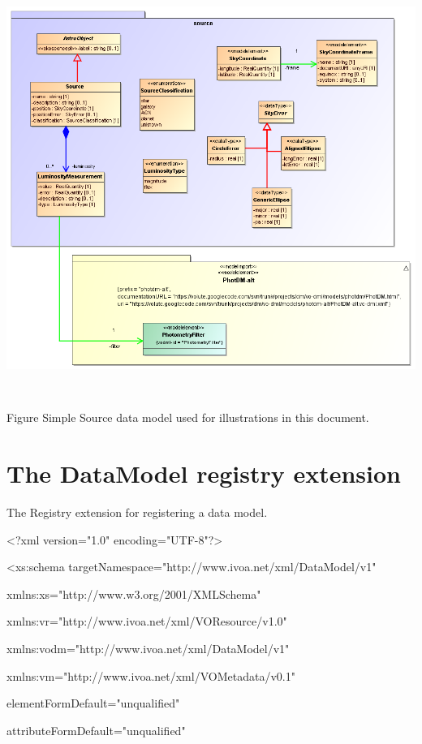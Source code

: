 \documentclass[10pt,a4paper]{ivoa}
\begin{document}
\includegraphics[width=6in,height=5.32014in]{./media/image32.png}

Figure Simple Source data model used for illustrations in this document.

\hypertarget{the-datamodel-registry-extension}{%
\section{The DataModel registry
extension}\label{the-datamodel-registry-extension}}

The Registry extension for registering a data model.

\textless?xml version="1.0" encoding="UTF-8"?\textgreater{}

\textless xs:schema
targetNamespace="http://www.ivoa.net/xml/DataModel/v1"

xmlns:xs="http://www.w3.org/2001/XMLSchema"

xmlns:vr="http://www.ivoa.net/xml/VOResource/v1.0"

xmlns:vodm="http://www.ivoa.net/xml/DataModel/v1"

xmlns:vm="http://www.ivoa.net/xml/VOMetadata/v0.1"

elementFormDefault="unqualified"

attributeFormDefault="unqualified"
\end{document}
